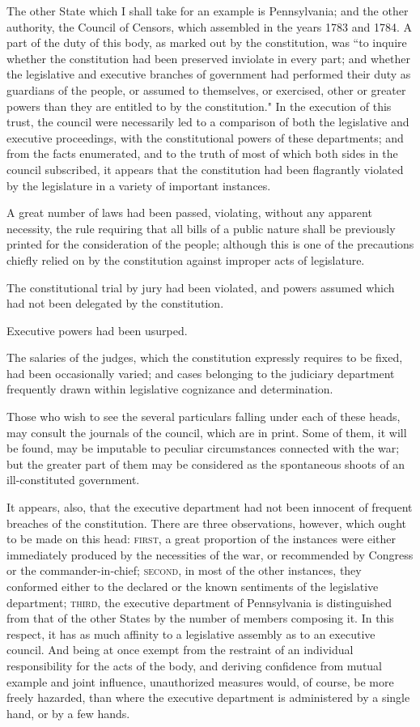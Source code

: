 The other State which I shall take for an example is Pennsylvania; and the other authority, the Council of Censors, which assembled in the years 1783 and 1784. A part of the duty of this body, as marked out by the constitution, was ``to inquire whether the constitution had been preserved inviolate in every part; and whether the legislative and executive branches of government had performed their duty as guardians of the people, or assumed to themselves, or exercised, other or greater powers than they are entitled to by the constitution." In the execution of this trust, the council were necessarily led to a comparison of both the legislative and executive proceedings, with the constitutional powers of these departments; and from the facts enumerated, and to the truth of most of which both sides in the council subscribed, it appears that the constitution had been flagrantly violated by the legislature in a variety of important instances.

A great number of laws had been passed, violating, without any apparent necessity, the rule requiring that all bills of a public nature shall be previously printed for the consideration of the people; although this is one of the precautions chiefly relied on by the constitution against improper acts of legislature.

The constitutional trial by jury had been violated, and powers assumed which had not been delegated by the constitution.

Executive powers had been usurped.

The salaries of the judges, which the constitution expressly requires to be fixed, had been occasionally varied; and cases belonging to the judiciary department frequently drawn within legislative cognizance and determination.

Those who wish to see the several particulars falling under each of these heads, may consult the journals of the council, which are in print. Some of them, it will be found, may be imputable to peculiar circumstances connected with the war; but the greater part of them may be considered as the spontaneous shoots of an ill-constituted government.

It appears, also, that the executive department had not been innocent of frequent breaches of the constitution. There are three observations, however, which ought to be made on this head: \textsc{first}, a great proportion of the instances were either immediately produced by the necessities of the war, or recommended by Congress or the commander-in-chief; \textsc{second}, in most of the other instances, they conformed either to the declared or the known sentiments of the legislative department; \textsc{third}, the executive department of Pennsylvania is distinguished from that of the other States by the number of members composing it. In this respect, it has as much affinity to a legislative assembly as to an executive council. And being at once exempt from the restraint of an individual responsibility for the acts of the body, and deriving confidence from mutual example and joint influence, unauthorized measures would, of course, be more freely hazarded, than where the executive department is administered by a single hand, or by a few hands.

